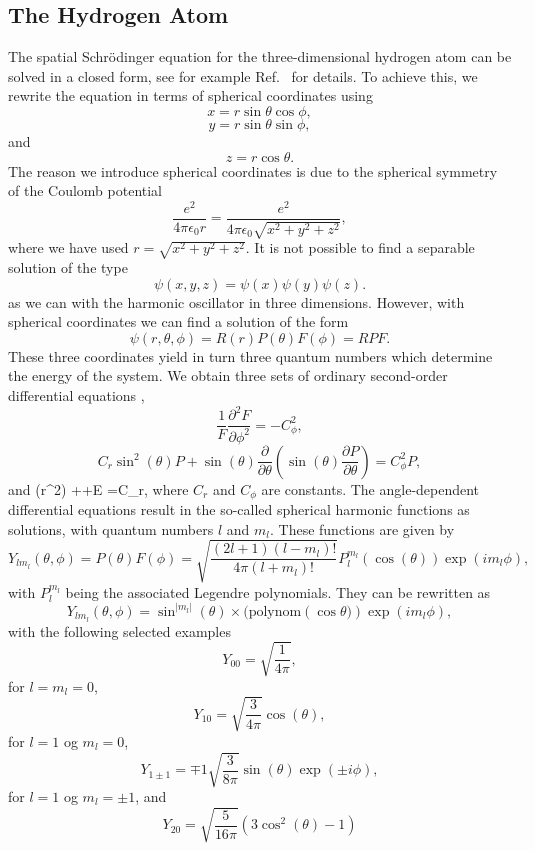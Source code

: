 \subsection{The Hydrogen Atom}

The spatial Schr\"odinger equation for the three-dimensional hydrogen atom can be solved in a closed form,
see for example Ref.~\cite{liboff} for details.
To achieve this, we rewrite the 
equation in terms of  
spherical coordinates using
     \[
        x=r\sin{\theta} \cos{\phi},  
      \]
      \[
        y=r\sin{\theta} \sin{\phi},
     \]
and
     \[
        z=r\cos{\theta}.
     \]
The reason we introduce spherical coordinates is due to the spherical symmetry of the Coulomb potential
\[
    \frac{e^2}{4\pi\epsilon_0r}=\frac{e^2}{4\pi\epsilon_0\sqrt{x^2+y^2+z^2}},
\]
where we have used $r=\sqrt{x^2+y^2+z^2}$. 
It is not possible to find a separable solution of the type
\[
    \psi(x,y,z)=\psi(x)\psi(y)\psi(z).
\]
as we can with the harmonic oscillator in three dimensions. However, with spherical coordinates we can find a solution
of the form
\[
   \psi(r,\theta,\phi)=R(r)P(\theta)F(\phi)=RPF.
\]
These three coordinates yield in turn three quantum numbers which determine the energy of the system.
We obtain three sets of ordinary second-order differential equations \cite{liboff}, 
\[
   \frac{1}{F}\frac{\partial^2 F }{\partial \phi^2}=-C^2_{\phi},
\]
\[
   C_r\sin^2{(\theta)}P+\sin{(\theta)}\frac{\partial }{\partial \theta}(\sin{(\theta)}
     \frac{\partial P}{\partial \theta})=C_{\phi}^2P,
\]
and
\be
{}
          (r^2) 
++E
=C_r,
\label{eq:radiell}
\ee
where $C_r$ and $C_{\phi}$ are constants. 
The angle-dependent differential equations result in the so-called spherical harmonic functions as
solutions, with quantum numbers $l$ and $m_l$. These functions are given by
\[
    Y_{lm_l}(\theta,\phi)=P(\theta)F(\phi)=\sqrt{\frac{(2l+1)(l-m_l)!}{4\pi (l+m_l)!}}
                      P_l^{m_l}(\cos{(\theta)})\exp{(im_l\phi)},
\]
with $P_l^{m_l}$ being the associated Legendre polynomials.
They can be rewritten as 
\[
   Y_{lm_l}(\theta,\phi)=\sin^{|m_l|}(\theta) \times (\mathrm{polynom}(\cos{\theta)})\exp{(im_l\phi)},
\]
with the following selected examples
\[
   Y_{00}=\sqrt{\frac{1}{4\pi}},
\]
for $l=m_l=0$, 
\[
   Y_{10}=\sqrt{\frac{3}{4\pi}}\cos{(\theta)},
\]
for $l=1$ og $m_l=0$, 
\[
   Y_{1\pm 1}=\mp 1\sqrt{\frac{3}{8\pi}}\sin{(\theta)}\exp{(\pm i\phi)},
\]
for  $l=1$ og $m_l=\pm 1$, and 
\[
   Y_{20}=\sqrt{\frac{5}{16\pi}}(3\cos^2(\theta)-1)
\]
